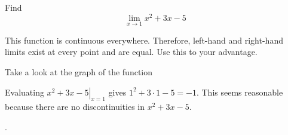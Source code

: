 \documentclass{ximera}
\begin{document}
\begin{question}
  Find 
  \[
  \displaystyle \lim_{x\to 1} x^2+3x-5
  \]
  \begin{solution}
    \begin{hint}
      This function is continuous everywhere. Therefore, left-hand and right-hand limits exist at every point and are equal. Use this to your advantage.
    \end{hint}
     \begin{hint}
    Take a look at the graph of the function
    \begin{center}
      \end{center}
    \end{hint}
    \begin{hint}
     Evaluating $\left.x^2+3x-5\right|_{x=1}$ gives $1^2+3\cdot1-5=-1$. This seems reasonable because there are no discontinuities in $x^2+3x-5$.
    \end{hint}
    .
  \end{solution}
\end{question}
\end{document}
